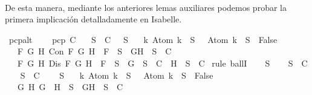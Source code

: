\begin{isabellebody}
\ \ \ \ \isamarkupfalse%
\isanewline
\ \ \isamarkupfalse%
\isanewline
{}\isamarkupfalse%
%
\endisatagproof
{\isafoldproof}%
%
\isadelimproof
%
\endisadelimproof
%
\begin{isamarkuptext}%
De esta manera, mediante los anteriores lemas auxiliares podemos probar la primera
  implicación detalladamente en Isabelle.%
\end{isamarkuptext}\isamarkuptrue%
\isamarkupfalse%
\ pcp{\isacharunderscore}alt{}{\isacharcolon}\ \isanewline
\ \ \ {\isachardoublequoteopen}pcp\ C{\isachardoublequoteclose}\isanewline
\ \ \ {\isachardoublequoteopen}{\isasymforall}S\ {\isasymin}\ C{\isachardot}\ {\isasymbottom}\ {\isasymnotin}\ S\isanewline
\ \ {\isasymand}\ {\isacharparenleft}{\isasymforall}k{\isachardot}\ Atom\ k\ {\isasymin}\ S\ {\isasymlongrightarrow}\ \isactrlbold {\isasymnot}\ {\isacharparenleft}Atom\ k{\isacharparenright}\ {\isasymin}\ S\ {\isasymlongrightarrow}\ False{\isacharparenright}\isanewline
\ \ {\isasymand}\ {\isacharparenleft}{\isasymforall}F\ G\ H{\isachardot}\ Con\ F\ G\ H\ {\isasymlongrightarrow}\ F\ {\isasymin}\ S\ {\isasymlongrightarrow}\ {\isacharbraceleft}G{\isacharcomma}H{\isacharbraceright}\ {\isasymunion}\ S\ {\isasymin}\ C{\isacharparenright}\isanewline
\ \ {\isasymand}\ {\isacharparenleft}{\isasymforall}F\ G\ H{\isachardot}\ Dis\ F\ G\ H\ {\isasymlongrightarrow}\ F\ {\isasymin}\ S\ {\isasymlongrightarrow}\ {\isacharbraceleft}G{\isacharbraceright}\ {\isasymunion}\ S\ {\isasymin}\ C\ {\isasymor}\ {\isacharbraceleft}H{\isacharbraceright}\ {\isasymunion}\ S\ {\isasymin}\ C{\isacharparenright}{\isachardoublequoteclose}\isanewline
%
\isadelimproof
%
\endisadelimproof
%
\isatagproof
{}\isamarkupfalse%
\ {\isacharparenleft}rule\ ballI{\isacharparenright}\isanewline
\ \ \isamarkupfalse%
\ S\isanewline
\ \ \isamarkupfalse%
\ {\isachardoublequoteopen}S\ {\isasymin}\ C{\isachardoublequoteclose}\isanewline
\ \ \isamarkupfalse%
\ {\isachardoublequoteopen}{\isacharparenleft}{\isasymforall}S\ {\isasymin}\ C{\isachardot}\isanewline
\ \ {\isasymbottom}\ {\isasymnotin}\ S\isanewline
\ \ {\isasymand}\ {\isacharparenleft}{\isasymforall}k{\isachardot}\ Atom\ k\ {\isasymin}\ S\ {\isasymlongrightarrow}\ \isactrlbold {\isasymnot}\ {\isacharparenleft}Atom\ k{\isacharparenright}\ {\isasymin}\ S\ {\isasymlongrightarrow}\ False{\isacharparenright}\isanewline
\ \ {\isasymand}\ {\isacharparenleft}{\isasymforall}G\ H{\isachardot}\ G\ \isactrlbold {\isasymand}\ H\ {\isasymin}\ S\ {\isasymlongrightarrow}\ {\isacharbraceleft}G{\isacharcomma}H{\isacharbraceright}\ {\isasymunion}\ S\ {\isasymin}\ C{\isacharparenright}\isanewline

\end{isabellebody}
